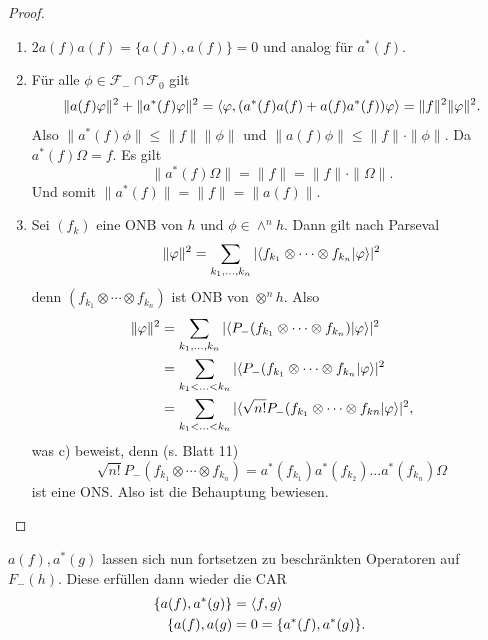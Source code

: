 \documentclass{mycourse}
\begin{document}
\begin{proof}
\begin{enumerate}[1)]
\item $2a(f)a(f) =\{a(f), a(f)\} =0$ und analog für $a^*(f)$.
\item Für alle $\phi \in \mathcal F_- \cap \mathcal F_0$ gilt
\[
\|a(f) \varphi \|^2 + \| a^*(f) \varphi \|^2 = \langle \varphi, (a^*(f) a(f) + a(f) a^*(f)) \varphi\rangle = \|f\|^2 \|\varphi\|^2.
\]
Also $\|a^*(f) \phi \| \le \| f\| \| \phi \|$ und $\| a(f) \phi \| \le \| f\| \cdot \| \phi \|$. Da $a^*(f) \Omega = f$. Es gilt
\[
\| a^*(f) \Omega\| = \| f\| = \| f \| \cdot \|\Omega\|.
\]
Und somit $\|a^*(f)\| = \|f\| = \| a(f)\|$.
\item Sei $(f_k)$ eine ONB von $h$ und $\phi \in \wedge^n h$. Dann gilt nach Parseval
\[
\|\varphi \|^2 = \sum_{k_1,...,k_n} | \langle f_{k_1} \otimes \cdots \otimes f_{k_n} | \varphi \rangle|^2
\]
denn $(f_{k_1} \otimes \cdots \otimes f_{k_n})$ ist ONB von $\otimes^n h$. Also 
\begin{align*}
\| \varphi\|^2 &= \sum_{k_1,..., k_n} |\langle P_-(f_{k_1} \otimes \cdots \otimes f_{k_n})| \varphi\rangle|^2\\
&= \sum_{k_1 < ... < k_n} |\langle P_-(f_{k_1} \otimes \cdots \otimes f_{k_n}|\varphi\rangle |^2 \\
&= \sum_{k_1 < ... < k_n} |\langle \sqrt{n!} P_-(f_{k_1} \otimes \cdots \otimes f_{kn} | \varphi \rangle |^2,
\end{align*}
was c) beweist, denn (s. Blatt 11)
\[
	\sqrt{n!} P_-(f_{k_1} \otimes \cdots \otimes f_{k_n}) = a^*(f_{k_1}) a^*(f_{k_2}) ... a^*(f_{k_n}) \Omega
\]
ist eine ONS. Also ist die Behauptung bewiesen.
\end{enumerate}
\end{proof}


\begin{nt*}
$a(f), a^*(g)$ lassen sich nun fortsetzen zu beschränkten Operatoren auf $F_-(h)$. Diese erfüllen dann wieder die CAR
\begin{align*}
\{a(f), a^*(g) \} &= \langle f,g\rangle\\
\{a(f), a(g)&= 0 =\{a^*(f), a^*(g)\}.
\end{align*}
\end{nt*}
\end{document}

